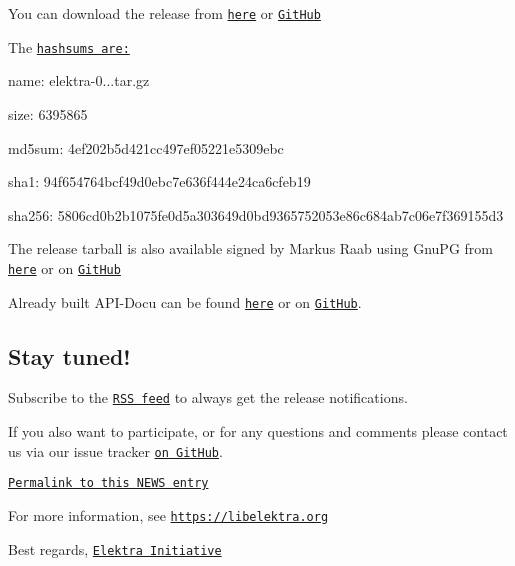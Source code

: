 You can download the release from \href{https://www.libelektra.org/ftp/elektra/releases/elektra-0.8.26.tar.gz}{\tt here} or \href{https://github.com/ElektraInitiative/ftp/blob/master/releases/elektra-0.8.26.tar.gz?raw=true}{\tt Git\+Hub}

The \href{https://github.com/ElektraInitiative/ftp/blob/master/releases/elektra-0.8.26.tar.gz.hashsum?raw=true}{\tt hashsums are\+:}


\begin{DoxyItemize}
\item name\+: elektra-\/0...\+tar.\+gz
\item size\+: 6395865
\item md5sum\+: 4ef202b5d421cc497ef05221e5309ebc
\item sha1\+: 94f654764bcf49d0ebc7e636f444e24ca6cfeb19
\item sha256\+: 5806cd0b2b1075fe0d5a303649d0bd9365752053e86c684ab7c06e7f369155d3
\end{DoxyItemize}

The release tarball is also available signed by Markus Raab using Gnu\+PG from \href{https://www.libelektra.org/ftp/elektra/releases/elektra-0.8.26.tar.gz.gpg}{\tt here} or on \href{https://github.com/ElektraInitiative/ftp/blob/master/releases//elektra-0.8.26.tar.gz.gpg?raw=true}{\tt Git\+Hub}

Already built A\+P\+I-\/\+Docu can be found \href{https://doc.libelektra.org/api/0.8.26/html/}{\tt here} or on \href{https://github.com/ElektraInitiative/doc/tree/master/api/0.8.26}{\tt Git\+Hub}.

\subsection*{Stay tuned!}

Subscribe to the \href{https://www.libelektra.org/news/feed.rss}{\tt R\+SS feed} to always get the release notifications.

If you also want to participate, or for any questions and comments please contact us via our issue tracker \href{http://issues.libelektra.org}{\tt on Git\+Hub}.

\href{https://www.libelektra.org/news/0.8.26-release}{\tt Permalink to this N\+E\+WS entry}

For more information, see \href{https://libelektra.org}{\tt https\+://libelektra.\+org}

Best regards, \href{https://www.libelektra.org/developers/authors}{\tt Elektra Initiative} 